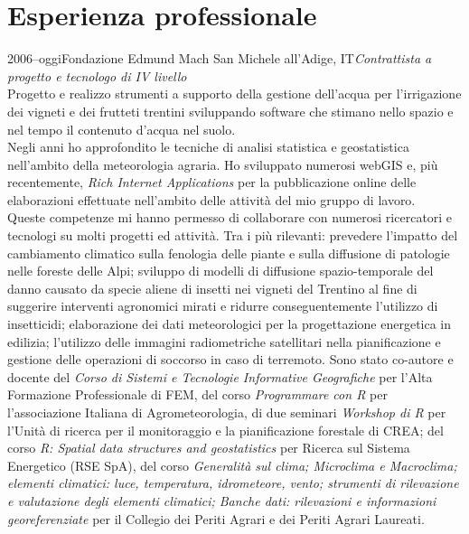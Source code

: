 \documentclass{curriculum}
\begin{document}
    \section{Esperienza professionale}
    \begin{entrylist}
    \entry 
        {2006--oggi}{Fondazione Edmund Mach} {San Michele all'Adige, IT}{\emph{Contrattista a progetto e tecnologo di IV livello}\hfill\vspace{3pt}\\
        Progetto e realizzo strumenti a supporto della gestione dell'acqua per l'irrigazione dei vigneti e dei frutteti trentini sviluppando software che stimano nello spazio e nel tempo il contenuto d'acqua nel suolo.
        \\Negli anni ho approfondito le tecniche di analisi statistica e geostatistica nell'ambito della meteorologia agraria. Ho sviluppato numerosi webGIS e, più recentemente, \textit{Rich Internet Applications} per la pubblicazione online delle elaborazioni effettuate nell'ambito delle attività del mio gruppo di lavoro.\\
        Queste competenze mi hanno permesso di collaborare con numerosi ricercatori e tecnologi su molti progetti ed attività. Tra i più rilevanti: prevedere l'impatto del cambiamento climatico sulla fenologia delle piante e sulla diffusione di patologie nelle foreste delle Alpi; sviluppo di modelli di diffusione spazio-temporale del danno causato da specie aliene di insetti nei vigneti del Trentino al fine di suggerire interventi agronomici mirati e ridurre conseguentemente l'utilizzo di insetticidi; elaborazione dei dati meteorologici per la progettazione energetica in edilizia; l'utilizzo delle immagini radiometriche satellitari nella pianificazione e gestione delle operazioni di soccorso in caso di terremoto.%
        Sono stato co-autore e docente del \textit{Corso di Sistemi e Tecnologie Informative Geografiche} per l'Alta Formazione Professionale di FEM, del corso \textit{Programmare con R} per l'associazione Italiana di Agrometeorologia, di due seminari \textit{Workshop di R} per l'Unità di ricerca per il monitoraggio e la pianificazione forestale di CREA; del corso \textit{R: Spatial data structures and geostatistics} per Ricerca sul Sistema Energetico (RSE SpA), del corso \textit{Generalità sul clima; Microclima e Macroclima; elementi climatici: luce, temperatura, idrometeore, vento; strumenti di rilevazione e valutazione degli elementi climatici; Banche dati: rilevazioni e informazioni georeferenziate} per il Collegio dei Periti Agrari e dei Periti Agrari Laureati.}
    \end{entrylist}
    
\end{document}
